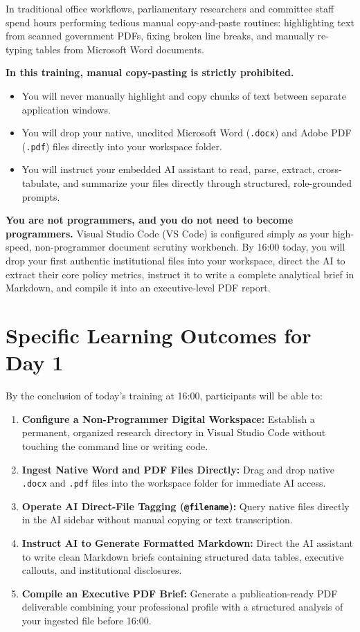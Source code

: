\documentclass[11pt, a4paper]{report}
\begin{document}
In traditional office workflows, parliamentary researchers and committee staff spend hours performing tedious manual copy-and-paste routines: highlighting text from scanned government PDFs, fixing broken line breaks, and manually re-typing tables from Microsoft Word documents. 

\textbf{In this training, manual copy-pasting is strictly prohibited.}
\begin{itemize}[label=-]
    \item You will never manually highlight and copy chunks of text between separate application windows.
    \item You will drop your native, unedited Microsoft Word (\texttt{.docx}) and Adobe PDF (\texttt{.pdf}) files directly into your workspace folder.
    \item You will instruct your embedded AI assistant to read, parse, extract, cross-tabulate, and summarize your files directly through structured, role-grounded prompts.
\end{itemize}

\textbf{You are not programmers, and you do not need to become programmers.} Visual Studio Code (VS Code) is configured simply as your high-speed, non-programmer document scrutiny workbench. By 16:00 today, you will drop your first authentic institutional files into your workspace, direct the AI to extract their core policy metrics, instruct it to write a complete analytical brief in Markdown, and compile it into an executive-level PDF report.

\section{Specific Learning Outcomes for Day 1}
By the conclusion of today's training at 16:00, participants will be able to:
\begin{enumerate}[label=\textbf{1.\arabic*}]
    \item \textbf{Configure a Non-Programmer Digital Workspace:} Establish a permanent, organized research directory in Visual Studio Code without touching the command line or writing code.
    \item \textbf{Ingest Native Word and PDF Files Directly:} Drag and drop native \texttt{.docx} and \texttt{.pdf} files into the workspace folder for immediate AI access.
    \item \textbf{Operate AI Direct-File Tagging (\texttt{@filename}):} Query native files directly in the AI sidebar without manual copying or text transcription.
    \item \textbf{Instruct AI to Generate Formatted Markdown:} Direct the AI assistant to write clean Markdown briefs containing structured data tables, executive callouts, and institutional disclosures.
    \item \textbf{Compile an Executive PDF Brief:} Generate a publication-ready PDF deliverable combining your professional profile with a structured analysis of your ingested file before 16:00.
\end{enumerate}
\end{document}
